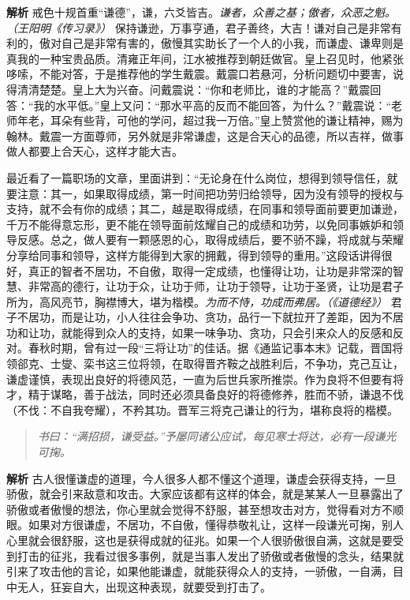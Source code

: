 \textbf{解析} 戒色十规首重“谦德”，谦，六爻皆吉。\textit{谦者，众善之基；傲者，众恶之魁。（王阳明《传习录》）} 保持谦逊，万事亨通，君子善终，大吉！谦对自己是非常有利的，傲对自己是非常有害的，傲慢其实助长了一个人的小我，而谦虚、谦卑则是真我的一种宝贵品质。清雍正年间，江水被推荐到朝廷做官。皇上召见时，他紧张哆嗦，不能对答，于是推荐他的学生戴震。戴震口若悬河，分析问题切中要害，说得清清楚楚。皇上大为兴奋。问戴震说：“你和老师比，谁的才能高？”戴震回答：“我的水平低。”皇上又问：“那水平高的反而不能回答，为什么？”戴震说：“老师年老，耳朵有些背，可他的学问，超过我一万倍。”皇上赞赏他的谦让精神，赐为翰林。戴震一方面尊师，另外就是非常谦虚，这是合天心的品德，所以吉祥，做事做人都要上合天心，这样才能大吉。

最近看了一篇职场的文章，里面讲到：“无论身在什么岗位，想得到领导信任，就要注意：其一，如果取得成绩，第一时间把功劳归给领导，因为没有领导的授权与支持，就不会有你的成绩；其二，越是取得成绩，在同事和领导面前要更加谦逊，千万不能得意忘形，更不能在领导面前炫耀自己的成绩和功劳，以免同事嫉妒和领导反感。总之，做人要有一颗感恩的心，取得成绩后，要不骄不躁，将成就与荣耀分享给同事和领导，这样方能得到大家的拥戴，得到领导的重用。”这段话讲得很好，真正的智者不居功，不自傲，取得一定成绩，也懂得让功，让功是非常深的智慧、非常高的德行，让功于众，让功于师，让功于领导，让功于圣贤，让功是君子所为，高风亮节，胸襟博大，堪为楷模。\textit{为而不恃，功成而弗居。（《道德经》）} 君子不居功，而是让功，小人往往会争功、贪功，品行一下就拉开了差距，因为不居功和让功，就能得到众人的支持，如果一味争功、贪功，只会引来众人的反感和反对。春秋时期，曾有过一段“三将让功”的佳话。据《通监记事本末》记载，晋国将领郤克、士燮、栾书这三位将领，在取得晋齐鞍之战胜利后，不争功，克己互让，谦虚谨慎，表现出良好的将德风范，一直为后世兵家所推崇。作为良将不但要有将才，精于谋略，善于战法，同时还必须具备良好的将德修养，胜而不骄，谦退不伐（不伐：不自我夸耀），不矜其功。晋军三将克己谦让的行为，堪称良将的楷模。

\begin{quote}\it
    书曰：“满招损，谦受益。”予屡同诸公应试，每见寒士将达，必有一段谦光可掬。
\end{quote}

\textbf{解析} 古人很懂谦虚的道理，今人很多人都不懂这个道理，谦虚会获得支持，一旦骄傲，就会引来敌意和攻击。大家应该都有这样的体会，就是某某人一旦暴露出了骄傲或者傲慢的想法，你心里就会觉得不舒服，甚至想攻击对方，觉得看对方不顺眼。如果对方很谦虚，不居功，不自傲，懂得恭敬礼让，这样一段谦光可掬，别人心里就会很舒服，这也是获得成就的征兆。如果一个人很骄傲很自满，这就是要受到打击的征兆，我看过很多事例，就是当事人发出了骄傲或者傲慢的念头，结果就引来了攻击他的言论，如果他能谦虚，就能获得众人的支持，一骄傲，一自满，目中无人，狂妄自大，出现这种表现，就要受到打击了。

